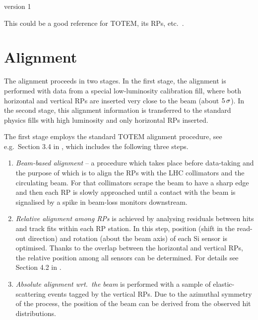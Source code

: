 \documentclass{article}
\def\un#1{\,{\rm #1}}
\begin{document}
\centerline{version 1} %
\vskip2cm


This could be a good reference for TOTEM, its RPs, etc.~\cite{totem-jinst}.

\section{Alignment}
\label{s:alignment}

The alignment proceeds in two stages. In the first stage, the alignment is performed with data from a special low-luminosity calibration fill, where both horizontal and vertical RPs are inserted very close to the beam (about $5\un{\sigma}$). In the second stage, this alignment information is transferred to the standard physics fills with high luminosity and only horizontal RPs inserted.

The first stage employs the standard TOTEM alignment procedure, see e.g.~Section 3.4 in \cite{totem-ijmp}, which includes the following three steps.
\begin{enumerate}[noitemsep]
\item {\em Beam-based alignment} -- a procedure which takes place before data-taking and the purpose of which is to align the RPs with the LHC collimators and the circulating beam. For that collimators scrape the beam to have a sharp edge and then each RP is slowly approached until a contact with the beam is signalised by a spike in beam-loss monitors downstream.
\item {\em Relative alignment among RPs} is achieved by analysing residuals between hits and track fits within each RP station. In this step, position (shift in the read-out direction) and rotation (about the beam axis) of each Si sensor is optimised. Thanks to the overlap between the horizontal and vertical RPs, the relative position among all sensors can be determined. For details see Section 4.2 in \cite{jan_thesis}.
\item {\em Absolute alignment wrt.~the beam} is performed with a sample of elastic-scattering events tagged by the vertical RPs. Due to the azimuthal symmetry of the process, the position of the beam can be derived from the observed hit distributions.
\end{enumerate}
\end{document}

